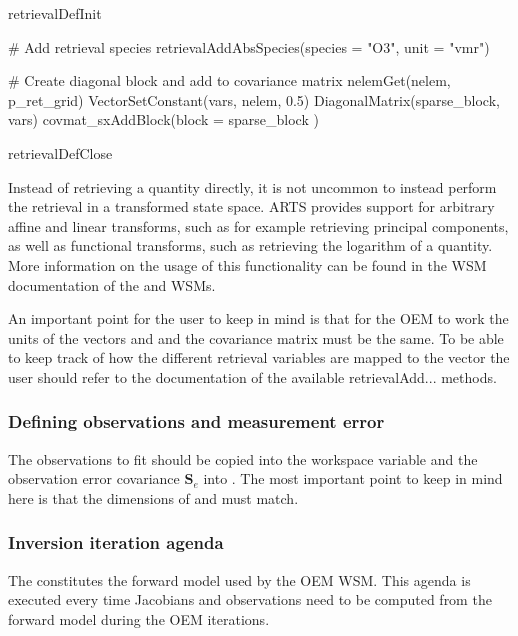 \begin{code}
retrievalDefInit

# Add retrieval species
retrievalAddAbsSpecies(species = "O3", unit = "vmr")

# Create diagonal block and add to covariance matrix
nelemGet(nelem, p_ret_grid)
VectorSetConstant(vars, nelem, 0.5)
DiagonalMatrix(sparse_block, vars)
covmat_sxAddBlock(block = sparse_block )

retrievalDefClose
\end{code}

Instead of retrieving a quantity directly, it is not uncommon
to instead perform the retrieval in a transformed state space. ARTS
provides support for arbitrary affine and linear transforms, such
as for example retrieving principal components, as well as functional
transforms, such as retrieving the logarithm of a quantity. More
information on the usage of this functionality can be found in the
WSM documentation of the 
and  WSMs.

An important point for the user to keep in mind is that for the OEM to
work the units of the vectors  and  and
 the covariance matrix  must be the same. To be
able to keep track of how the different retrieval variables are mapped
to the  vector the user should refer to the
documentation of the available retrievalAdd... methods.

\subsubsection{Defining observations and measurement error}

The observations to fit should be copied into the  workspace
variable and the observation error covariance $\mathbf{S}_e$ into .
The most important point to keep in mind here is that the dimensions of
  and  must match.

\subsubsection{Inversion iteration agenda}

The  constitutes the forward model used by
the OEM WSM. This agenda is executed every time Jacobians and observations need
to be computed from the forward model during the OEM iterations.


